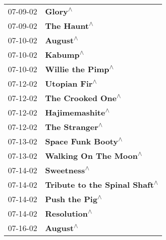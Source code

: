 \begin{supertabular}{p{0.25\columnwidth}p{0.75\columnwidth}}
 07-09-02 &                                                                    \textbf{Glory\textsuperscript{$\wedge$}} \\
 07-09-02 &                                                                \textbf{The Haunt\textsuperscript{$\wedge$}} \\
 07-10-02 &                                                                   \textbf{August\textsuperscript{$\wedge$}} \\
 07-10-02 &                                                                   \textbf{Kabump\textsuperscript{$\wedge$}} \\
 07-10-02 &                                                          \textbf{Willie the Pimp\textsuperscript{$\wedge$}} \\
 07-12-02 &                                                              \textbf{Utopian Fir\textsuperscript{$\wedge$}} \\
 07-12-02 &                                                          \textbf{The Crooked One\textsuperscript{$\wedge$}} \\
 07-12-02 &                                                            \textbf{Hajimemashite\textsuperscript{$\wedge$}} \\
 07-12-02 &                                                             \textbf{The Stranger\textsuperscript{$\wedge$}} \\
 07-13-02 &                                                         \textbf{Space Funk Booty\textsuperscript{$\wedge$}} \\
 07-13-02 &                                                      \textbf{Walking On The Moon\textsuperscript{$\wedge$}} \\
 07-14-02 &                                                                \textbf{Sweetness\textsuperscript{$\wedge$}} \\
 07-14-02 &                                              \textbf{Tribute to the Spinal Shaft\textsuperscript{$\wedge$}} \\
 07-14-02 &                                                             \textbf{Push the Pig\textsuperscript{$\wedge$}} \\
 07-14-02 &                                                               \textbf{Resolution\textsuperscript{$\wedge$}} \\
 07-16-02 &                                                                   \textbf{August\textsuperscript{$\wedge$}} \\

\end{supertabular}
